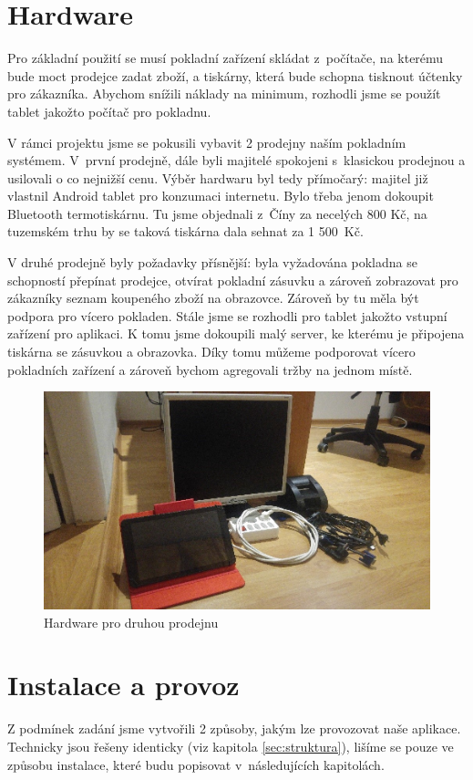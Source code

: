 \documentclass[a4paper,11pt,oneside]{article}
\begin{document}
\section{Hardware}

Pro základní použití se musí pokladní zařízení skládat z~počítače, na kterému bude moct prodejce zadat zboží, a tiskárny, která bude schopna tisknout účtenky pro zákazníka. Abychom snížili náklady na minimum, rozhodli jsme se použít tablet jakožto počítač pro pokladnu.

V rámci projektu jsme se pokusili vybavit 2 prodejny naším pokladním systémem. V~první prodejně, dále byli majitelé spokojeni s~klasickou prodejnou a usilovali o co nejnižší cenu. Výběr hardwaru byl tedy přímočarý: majitel již vlastnil Android tablet pro konzumaci internetu. Bylo třeba jenom dokoupit Bluetooth termotiskárnu. Tu jsme objednali z~Číny za necelých 800 Kč, na tuzemském trhu by se taková tiskárna dala sehnat za 1 500~Kč.  

V druhé prodejně byly požadavky přísnější: byla vyžadována pokladna se schopností přepínat prodejce, otvírat pokladní zásuvku a zároveň zobrazovat pro zákazníky seznam koupeného zboží na obrazovce. Zároveň by tu měla být podpora pro vícero pokladen. Stále jsme se rozhodli pro tablet jakožto vstupní zařízení pro aplikaci. K tomu jsme dokoupili malý server, ke kterému je připojena tiskárna se zásuvkou a obrazovka. Díky tomu můžeme podporovat vícero pokladních zařízení a zároveň bychom agregovali tržby na jednom místě.

\begin{figure}[H]
	\centering
	\includegraphics[width=0.7\linewidth]{../hardware}
	\caption{Hardware pro druhou prodejnu}
	\label{fig:hardware}
\end{figure}

\section{Instalace a provoz}
Z podmínek zadání jsme vytvořili 2 způsoby, jakým lze provozovat naše aplikace. Technicky jsou řešeny identicky (viz kapitola \ref{sec:struktura}), lišíme se pouze ve způsobu instalace, které budu popisovat v~následujících kapitolách.
\end{document}
